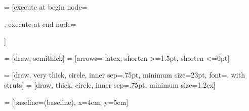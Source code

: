\usepackage{tikz}
\usetikzlibrary{arrows.meta}

 = [execute at begin node={\strut}, execute at end node={\strut}]

 = [draw, semithick]
 = [arrows={-latex}, shorten >=1.5pt, shorten <=0pt]

 = [draw, very thick, circle, inner sep=.75pt, minimum size=23pt, font=\small, with struts]
 = [draw, thick, circle, inner sep=.75pt, minimum size=1.2ex]

 = [baseline=(baseline), x=4em, y=5em]
